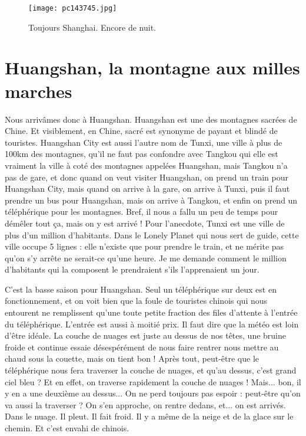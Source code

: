 \documentclass{book}
\begin{document}
\begin{figure}[h]
\centering
\texttt{[image: pc143745.jpg]}
\caption*{Toujours Shanghai. Encore de nuit.}
\end{figure}



\chapter{Huangshan, la montagne aux milles marches}
Nous arrivâmes donc à Huangshan. Huangshan est une des montagnes sacrées de Chine. Et visiblement, en Chine, sacré est synonyme de payant et blindé de touristes. Huangshan City est aussi l'autre nom de Tunxi, une ville à plus de 100km des montagnes, qu'il ne faut pas confondre avec Tangkou qui elle est vraiment la ville à coté des montagnes appelées Huangshan, mais Tangkou n'a pas de gare, et donc quand on veut visiter Huangshan, on prend un train pour Huangshan City, mais quand on arrive à la gare, on arrive à Tunxi, puis il faut prendre un bus pour Huangshan, mais on arrive à Tangkou, et enfin on prend un téléphérique pour les montagnes. Bref, il nous a fallu un peu de temps pour démêler tout ça, mais on y est arrivé ! Pour l’anecdote, Tunxi est une ville de plus d'un million d'habitants. Dans le Lonely Planet qui nous sert de guide, cette ville occupe 5 lignes  : elle n'existe que pour prendre le train, et ne mérite pas qu'on s'y arrête ne serait-ce qu'une heure. Je me demande comment le million d'habitants qui la composent le prendraient s'ils l’apprenaient un jour.

C'est la basse saison pour Huangshan. Seul un téléphérique sur deux est en fonctionnement, et on voit bien que la foule de touristes chinois qui nous entourent ne remplissent qu'une toute petite fraction des files d'attente à l'entrée du téléphérique. L'entrée est aussi à moitié prix. Il faut dire que la météo est loin d'être idéale. La couche de nuages est juste au dessus de nos têtes, une bruine froide et continue essaie désespérément de nous faire rentrer nous mettre au chaud sous la couette, mais on tient bon ! Après tout, peut-être que le téléphérique nous fera traverser la couche de nuages, et qu'au dessus, c'est grand ciel bleu ? Et en effet, on traverse rapidement la couche de nuages ! Mais... bon, il y en a une deuxième au dessus... On ne perd toujours pas espoir : peut-être qu'on va aussi la traverser ? On s'en approche, on rentre dedans, et... on est arrivés. Dans le nuage. Il pleut. Il fait froid. Il y a même de la neige et de la glace sur le chemin. Et c'est envahi de chinois.
\end{document}

